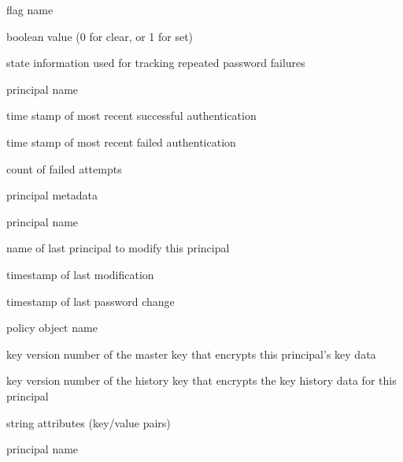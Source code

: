 \documentclass[letterpaper,10pt,english]{sphinxmanual}
\begin{document}
\begin{description}
\begin{description}
\sphinxAtStartPar
flag name

\sphinxAtStartPar
boolean value (0 for clear, or 1 for set)

\end{description}

\sphinxAtStartPar
state information used for tracking repeated password failures
\begin{description}
\sphinxAtStartPar
principal name

\sphinxAtStartPar
time stamp of most recent successful authentication

\sphinxAtStartPar
time stamp of most recent failed authentication

\sphinxAtStartPar
count of failed attempts

\end{description}

\sphinxAtStartPar
principal metadata
\begin{description}
\sphinxAtStartPar
principal name

\sphinxAtStartPar
name of last principal to modify this principal

\sphinxAtStartPar
timestamp of last modification

\sphinxAtStartPar
timestamp of last password change

\sphinxAtStartPar
policy object name

\sphinxAtStartPar
key version number of the master key that encrypts this
principal’s key data

\sphinxAtStartPar
key version number of the history key that encrypts the key
history data for this principal

\end{description}

\sphinxAtStartPar
string attributes (key/value pairs)
\begin{description}
\sphinxAtStartPar
principal name


\end{description}
\end{description}
\end{document}

